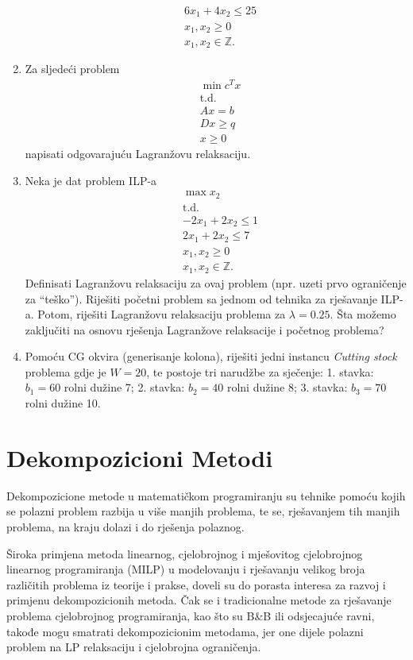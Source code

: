 \documentclass[a4paper, utf8, 11pt, colorlinks]{book}
\theoremstyle{definition}
\begin{document}
\begin{enumerate}
\begin{align*}
  	 & 6 x_1 + 4 x_2 \leq 25 \\
  	 & x_1, x_2 \geq 0 \\
  	 & x_1, x_2\in \mathbb{Z}.
  \end{align*}
\item  Za sljedeći problem 
\begin{align*}
	&\min c^T x \\
	&\mbox{t.d.}\\
	& Ax = b \\
	& D x \geq q \\
	& x \geq 0
\end{align*}
napisati odgovarajuću Lagranžovu relaksaciju. 
\item %
Neka je dat problem ILP-a
\begin{align*}
	&\max x_2 \\
    &\mbox{t.d.}\\
	& -2x_1 + 2x_2 \leq 1 \\
	& 2 x_1 + 2 x_2 \leq 7 \\
	& x_1, x_2 \geq 0 \\
	& x_1, x_2 \in \mathbb{Z}.
\end{align*}
Definisati Lagranžovu relaksaciju za ovaj problem (npr. uzeti prvo ograničenje za ``teško''). Riješiti početni problem sa jednom od tehnika za rješavanje ILP-a. Potom, riješiti Lagranžovu relaksaciju problema za $\lambda=0.25$. Šta možemo zaključiti na osnovu rješenja Lagranžove relaksacije i početnog problema? 
\item   Pomoću CG okvira (generisanje kolona), riješiti jedni instancu \emph{Cutting stock} problema gdje je  
$W = 20$, te postoje tri narudžbe za sječenje: 1. stavka: $b_1=60$ rolni dužine 7; 2. stavka: $b_2=40$ rolni dužine 8; 3. stavka: $b_3=70$ rolni dužine 10. 

 \end{enumerate}
 
 
 \chapter{Dekompozicioni Metodi}
 
Dekompozicione metode u matematičkom programiranju su tehnike pomoću kojih se polazni problem  razbija u više manjih problema, te se, rješavanjem tih manjih problema, na kraju dolazi i do rješenja polaznog.

Široka primjena metoda linearnog, cjelobrojnog i mješovitog cjelobrojnog linearnog programiranja (MILP) u modelovanju i rješavanju velikog broja različitih problema iz teorije i prakse, doveli su do porasta interesa  za razvoj i primjenu  dekompozicionih metoda. Čak se i tradicionalne metode za rješavanje problema cjelobrojnog programiranja, kao što su B\&B  ili odsjecajuće ravni, takođe   mogu smatrati dekompozicionim metodama, jer one dijele polazni problem na LP relaksaciju i cjelobrojna ograničenja.
\end{document}
